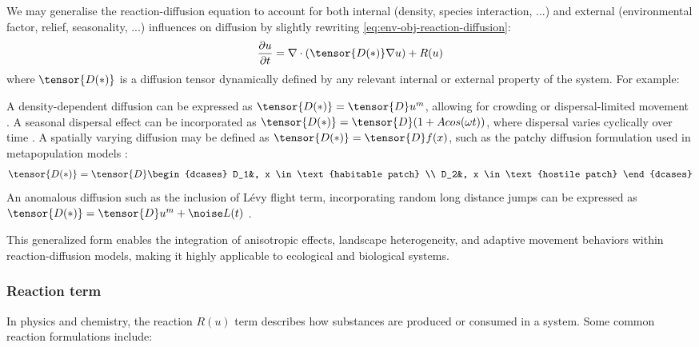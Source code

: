 We may generalise the reaction-diffusion equation to account for both internal (density, species interaction, ...) and external (environmental factor, relief, seasonality, ...) influences on diffusion by slightly rewriting \cref{eq:env-obj-reaction-diffusion}:
\begin{align}
    \frac{\partial u}{\partial t} = \nabla \cdot (\tensor{D(*)} \nabla u) + R(u)
\end{align}
where $\tensor{D(*)}$  is a diffusion tensor dynamically defined by any relevant internal or external property of the system. For example:
\begin{Itemize}
    \Item{} A density-dependent diffusion can be expressed as $\tensor{D(*)} = \tensor{D} u^m$, allowing for crowding or dispersal-limited movement \cite{Zhu2023}.
    \Item{} A seasonal dispersal effect can be incorporated as $\tensor{D(*)} = \tensor{D} (1 + A cos(\omega t) )$, where dispersal varies cyclically over time \cite{Katriel2021}.
    \Item{} A spatially varying diffusion may be defined as $\tensor{D(*)} = \tensor{D} f(x)$, such as the patchy diffusion formulation used in metapopulation models \cite{Czaran1998}:
    \begin{align}
        \tensor{D(*)} = \tensor{D} \begin{dcases}
            D_1&, x \in \text{habitable patch} \\
            D_2&, x \in \text{hostile patch}
        \end{dcases}
    \end{align}
    \Item{} An anomalous diffusion such as the inclusion of Lévy flight term, incorporating random long distance jumps can be expressed as $\tensor{D(*)} = \tensor{D} u^m + \noise L(t)$ \cite{Humphries2014,Chechkin2008}.
\end{Itemize}

This generalized form enables the integration of anisotropic effects, landscape heterogeneity, and adaptive movement behaviors within reaction-diffusion models, making it highly applicable to ecological and biological systems.

\subsubsection{Reaction term}
In physics and chemistry, the reaction $R(u)$ term describes how substances are produced or consumed in a system. Some common reaction formulations include:

